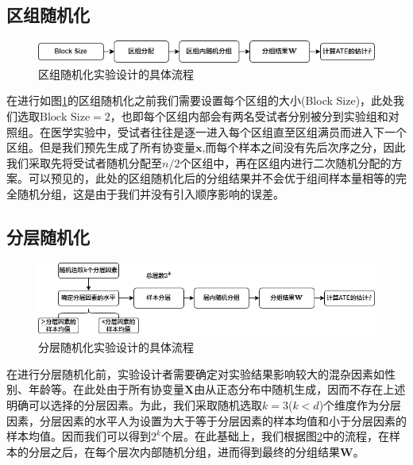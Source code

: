 \subsection{区组随机化}
\begin{figure}[!htbp]
    \centering
    \includegraphics[width=0.8\linewidth]{figures/Chapter4Block.drawio.png}
    \caption{区组随机化实验设计的具体流程}
    \label{fig:BlockDesign}
\end{figure}

在进行如图\ref{fig:BlockDesign}的区组随机化之前我们需要设置每个区组的大小(Block Size)，此处我们选取$\text{Block Size} = 2$，也即每个区组内部会有两名受试者分别被分到实验组和对照组。在医学实验中，受试者往往是逐一进入每个区组直至区组满员而进入下一个区组。但是我们预先生成了所有协变量$\mathbf{x}$,而每个样本之间没有先后次序之分，因此我们采取先将受试者随机分配至$n/2$个区组中，再在区组内进行二次随机分配的方案。可以预见的，此处的区组随机化后的分组结果并不会优于组间样本量相等的完全随机分组，这是由于我们并没有引入顺序影响的误差。


\subsection{分层随机化}
\begin{figure}[!htbp]
    \centering
    \includegraphics[width=0.8\linewidth]{figures/Chapter4Stratified.drawio.png}
    \caption{分层随机化实验设计的具体流程}
    \label{fig:StratifiedDesign}
\end{figure}

在进行分层随机化前，实验设计者需要确定对实验结果影响较大的混杂因素如性别、年龄等。在此处由于所有协变量$\mathbf{X}$由从正态分布中随机生成，因而不存在上述明确可以选择的分层因素。为此，我们采取随机选取$k=3$($k<d$)个维度作为分层因素，分层因素的水平人为设置为大于等于分层因素的样本均值和小于分层因素的样本均值。因而我们可以得到$2^k$个层。在此基础上，我们根据图\ref{fig:StratifiedDesign}中的流程，在样本的分层之后，在每个层次内部随机分组，进而得到最终的分组结果$\mathbf{W}$。

